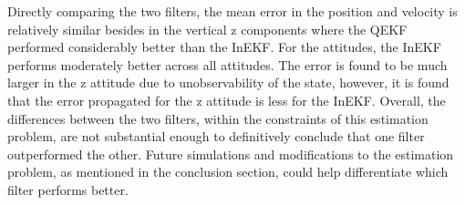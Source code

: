 Directly comparing the two filters, the mean error in the position and velocity is relatively similar besides in the vertical z components where the QEKF performed considerably better than the InEKF. For the attitudes, the InEKF performs moderately better across all attitudes. The error is found to be much larger in the z attitude due to unobservability of the state, however, it is found that the error propagated for the z attitude is less for the InEKF. Overall, the differences between the two filters, within the constraints of this estimation problem, are not substantial enough to definitively conclude that one filter outperformed the other. Future simulations and modifications to the estimation problem, as mentioned in the conclusion section, could help differentiate which filter performs better.




